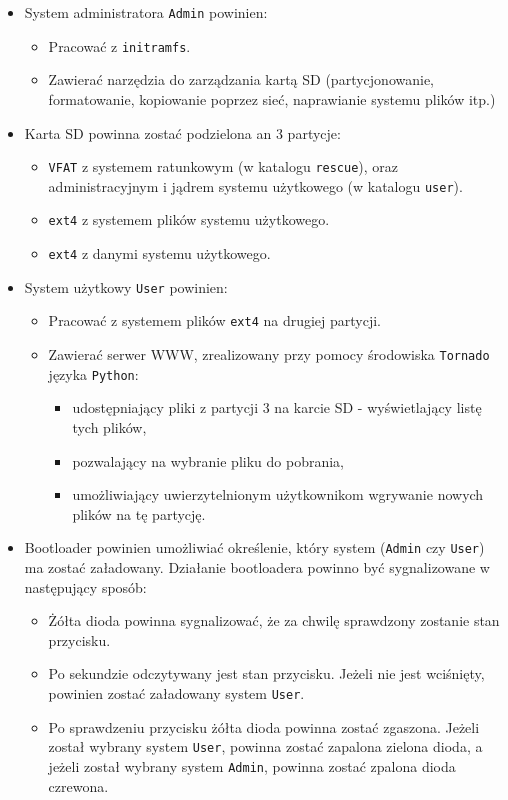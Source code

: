 \documentclass{article}
\begin{document}
\begin{itemize}
    \item System administratora \texttt{Admin} powinien:
    \begin{itemize}
        \item Pracować z \texttt{initramfs}.
        \item Zawierać narzędzia do zarządzania kartą SD (partycjonowanie, formatowanie, kopiowanie poprzez sieć, naprawianie systemu plików itp.)
    \end{itemize}
    \item Karta SD powinna zostać podzielona an 3 partycje:
    \begin{itemize}
        \item \texttt{VFAT} z systemem ratunkowym (w katalogu \texttt{rescue}), oraz administracyjnym i jądrem systemu
 użytkowego (w katalogu \texttt{user}).
 \item \texttt{ext4} z systemem plików systemu użytkowego.
 \item \texttt{ext4} z danymi systemu użytkowego.
    \end{itemize}
    \item System użytkowy \texttt{User} powinien:
    \begin{itemize}
        \item Pracować z systemem plików \texttt{ext4} na drugiej partycji.
        \item Zawierać serwer WWW, zrealizowany przy pomocy środowiska \texttt{Tornado} języka \texttt{Python}:
        \begin{itemize}
            \item udostępniający pliki z partycji 3 na karcie SD - wyświetlający listę tych plików,
            \item pozwalający na wybranie pliku do pobrania,
            \item umożliwiający uwierzytelnionym użytkownikom wgrywanie nowych plików na tę partycję.
        \end{itemize} 
    \end{itemize}
    \item Bootloader powinien umożliwiać określenie, który system (\texttt{Admin} czy \texttt{User}) ma zostać załadowany. Działanie bootloadera powinno być sygnalizowane w następujący sposób:
    \begin{itemize}
        \item Żółta dioda powinna sygnalizować, że za chwilę sprawdzony zostanie stan przycisku.
        \item Po sekundzie odczytywany jest stan przycisku. Jeżeli nie jest wciśnięty, powinien zostać załadowany system \texttt{User}.
        \item Po sprawdzeniu przycisku żółta dioda powinna zostać zgaszona. Jeżeli został wybrany system \texttt{User}, powinna zostać zapalona zielona dioda, a jeżeli został wybrany system \texttt{Admin}, powinna zostać zpalona dioda czrewona.
    \end{itemize}
\end{itemize}
\end{document}
